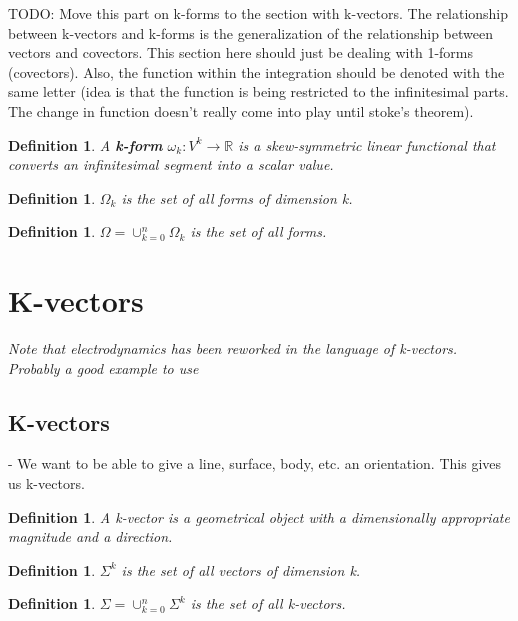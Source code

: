 \documentclass{book}
\newtheorem{defn}[equation]{Definition}
\begin{document}
TODO: Move this part on k-forms to the section with k-vectors. The relationship between k-vectors and k-forms is the generalization of the relationship between vectors and covectors. This section here should just be dealing with 1-forms (covectors). Also, the function within the integration should be denoted with the same letter (idea is that the function is being restricted to the infinitesimal parts. The change in function doesn't really come into play until stoke's theorem). 


\begin{defn}
	A \textbf{k-form} $\omega_k : V^k \to \mathbb{R}$ is a skew-symmetric linear functional that converts an infinitesimal segment into a scalar value. 
\end{defn}

\begin{defn}
	$\Omega_k$ is the set of all forms of dimension k. 
\end{defn}

\begin{defn}
	$\Omega = \cup_{k=0}^n\Omega_k$ is the set of all forms. 
\end{defn}

\section{K-vectors}

\emph{Note that electrodynamics has been reworked in the language of k-vectors. Probably a good example to use}




\subsection{K-vectors}

- We want to be able to give a line, surface, body, etc. an orientation. This gives us k-vectors.

\begin{defn}
	A k-vector is a geometrical object with a dimensionally appropriate magnitude and a direction. 
\end{defn}

\begin{defn}
	$\Sigma^k$ is the set of all vectors of dimension k. 
	\end{defn}

\begin{defn}
	$\Sigma = \cup_{k=0}^n \Sigma^k$ is the set of all k-vectors. 
\end{defn}
\end{document}

